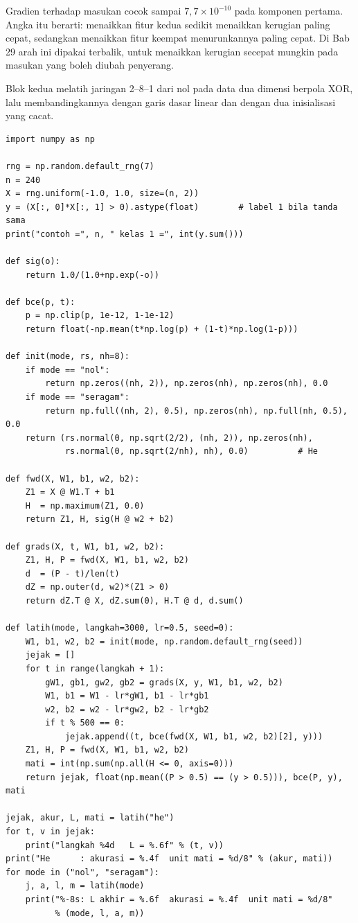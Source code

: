 Gradien terhadap masukan cocok sampai $7{,}7\times10^{-10}$ pada komponen pertama. Angka itu berarti: menaikkan fitur kedua sedikit menaikkan kerugian paling cepat, sedangkan menaikkan fitur keempat menurunkannya paling cepat. Di Bab 29 arah ini dipakai terbalik, untuk menaikkan
kerugian secepat mungkin pada masukan yang boleh diubah penyerang.

Blok kedua melatih jaringan 2--8--1 dari nol pada data dua dimensi berpola XOR, lalu
membandingkannya dengan garis dasar linear dan dengan dua inisialisasi yang cacat.

\begin{lab}
\begin{verbatim}
import numpy as np

rng = np.random.default_rng(7)
n = 240
X = rng.uniform(-1.0, 1.0, size=(n, 2))
y = (X[:, 0]*X[:, 1] > 0).astype(float)        # label 1 bila tanda sama
print("contoh =", n, " kelas 1 =", int(y.sum()))

def sig(o):
    return 1.0/(1.0+np.exp(-o))

def bce(p, t):
    p = np.clip(p, 1e-12, 1-1e-12)
    return float(-np.mean(t*np.log(p) + (1-t)*np.log(1-p)))

def init(mode, rs, nh=8):
    if mode == "nol":
        return np.zeros((nh, 2)), np.zeros(nh), np.zeros(nh), 0.0
    if mode == "seragam":
        return np.full((nh, 2), 0.5), np.zeros(nh), np.full(nh, 0.5), 0.0
    return (rs.normal(0, np.sqrt(2/2), (nh, 2)), np.zeros(nh),
            rs.normal(0, np.sqrt(2/nh), nh), 0.0)          # He

def fwd(X, W1, b1, w2, b2):
    Z1 = X @ W1.T + b1
    H  = np.maximum(Z1, 0.0)
    return Z1, H, sig(H @ w2 + b2)

def grads(X, t, W1, b1, w2, b2):
    Z1, H, P = fwd(X, W1, b1, w2, b2)
    d  = (P - t)/len(t)
    dZ = np.outer(d, w2)*(Z1 > 0)
    return dZ.T @ X, dZ.sum(0), H.T @ d, d.sum()

def latih(mode, langkah=3000, lr=0.5, seed=0):
    W1, b1, w2, b2 = init(mode, np.random.default_rng(seed))
    jejak = []
    for t in range(langkah + 1):
        gW1, gb1, gw2, gb2 = grads(X, y, W1, b1, w2, b2)
        W1, b1 = W1 - lr*gW1, b1 - lr*gb1
        w2, b2 = w2 - lr*gw2, b2 - lr*gb2
        if t % 500 == 0:
            jejak.append((t, bce(fwd(X, W1, b1, w2, b2)[2], y)))
    Z1, H, P = fwd(X, W1, b1, w2, b2)
    mati = int(np.sum(np.all(H <= 0, axis=0)))
    return jejak, float(np.mean((P > 0.5) == (y > 0.5))), bce(P, y), mati

jejak, akur, L, mati = latih("he")
for t, v in jejak:
    print("langkah %4d   L = %.6f" % (t, v))
print("He      : akurasi = %.4f  unit mati = %d/8" % (akur, mati))
for mode in ("nol", "seragam"):
    j, a, l, m = latih(mode)
    print("%-8s: L akhir = %.6f  akurasi = %.4f  unit mati = %d/8"
          % (mode, l, a, m))


\end{verbatim}
\end{lab}
